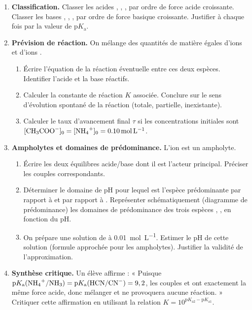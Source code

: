 \documentclass[11pt]{article}
\begin{document}
\begin{exercice}
\begin{enumerate}
    \item \textbf{Classification.} Classer les acides , , ,  par ordre de force acide croissante. Classer les bases , , ,  par ordre de force basique croissante. Justifier à chaque fois par la valeur de $\mathrm{p}K_{\mathrm{a}}$.
    \item \textbf{Prévision de réaction.} On mélange des quantités de matière égales d'ions  et d'ions . 
    \begin{enumerate}
        \item Écrire l'équation de la réaction éventuelle entre ces deux espèces. Identifier l'acide et la base réactifs.
        \item Calculer la constante de réaction $K$ associée. Conclure sur le sens d'évolution spontané de la réaction (totale, partielle, inexistante).
        \item Calculer le taux d'avancement final $\tau$ si les concentrations initiales sont $[\ce{CH3COO-}]_0 = [\ce{NH4+}]_0 = \SI{0,10}{\mole\per\liter}$.
    \end{enumerate}
    \item \textbf{Ampholytes et domaines de prédominance.} L'ion  est un ampholyte. 
    \begin{enumerate}
        \item Écrire les deux équilibres acide/base dont il est l'acteur principal. Préciser les couples correspondants.
        \item Déterminer le domaine de pH pour lequel  est l'espèce prédominante par rapport à  et par rapport à . Représenter schématiquement (diagramme de prédominance) les domaines de prédominance des trois espèces , ,  en fonction du pH.
        \item On prépare une solution de  à \SI{0,01}{\mole\per\liter}. Estimer le pH de cette solution (formule approchée pour les ampholytes). Justifier la validité de l'approximation.
    \end{enumerate}
    \item \textbf{Synthèse critique.} Un élève affirme : « Puisque $\mathrm{p}K_{\mathrm{a}}(\ce{NH4+/NH3}) = \mathrm{p}K_{\mathrm{a}}(\ce{HCN/CN-}) = 9,2$, les couples  et  ont exactement la même force acide, donc mélanger  et  ne provoquera aucune réaction. » Critiquer cette affirmation en utilisant la relation $K = 10^{\mathrm{p}K_{\mathrm{a2}} - \mathrm{p}K_{\mathrm{a1}}}$.
\end{enumerate}
\end{exercice}
\end{document}
